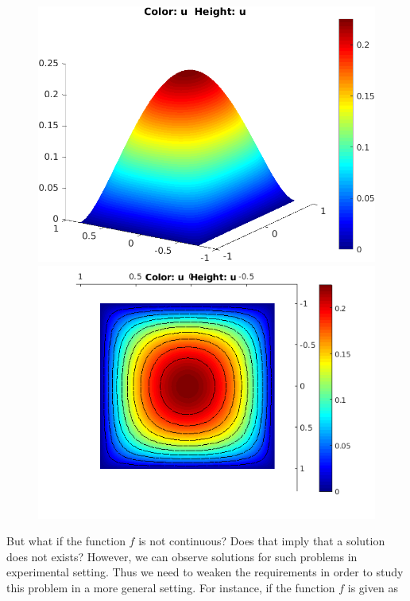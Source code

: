 \begin{figure}[h!]
	\centering
	\begin{minipage}{0.45\linewidth}
		\includegraphics[width=\linewidth]{Images/LaplaceSolution}

	\end{minipage}
	\hfill %
	\begin{minipage}{0.45\linewidth}
		\includegraphics[width=\linewidth]{Images/PoissonEquationWithContours.png}

	\end{minipage}
\end{figure}
\FloatBarrier
But what if the function $ f $ is not continuous? Does that imply that a solution does not exists? However, we can observe solutions for such problems in experimental setting. Thus we need to weaken the requirements in order to study this problem in a more general setting. For instance, if the function $ f $ is given as

